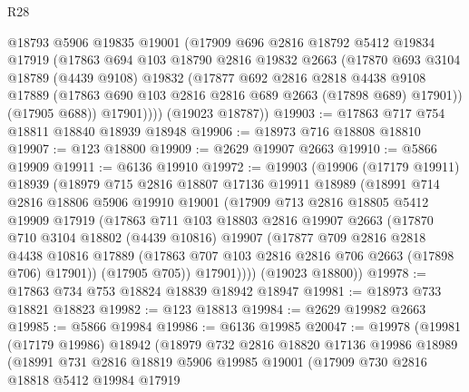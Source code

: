 \begin{lexlean}{R28}
\begin{coremodule}
          @18793
          @5906
          @19835
          @19001
          (@17909
            @696
            @2816
            @18792
            @5412
            @19834
            @17919
            (@17863
              @694
              @103
              @18790
              @2816
              @19832
              @2663
              (@17870
                @693
                @3104
                @18789
                (@4439 @9108)
                @19832
                (@17877
                  @692
                  @2816
                  @2818
                  @4438
                  @9108
                  @17889
                  (@17863 @690 @103 @2816 @2816 @689 @2663 (@17898 @689) @17901))
                (@17905 @688))
              @17901))))
      (@19023 @18787))
@19903 := @17863 @717 @754 @18811 @18840 @18939 @18948
@19906 := @18973 @716 @18808 @18810
@19907 := @123 @18800
@19909 := @2629 @19907 @2663
@19910 := @5866 @19909
@19911 := @6136 @19910
@19972 := @19903
    (@19906
      (@17179 @19911)
      @18939
      (@18979
        @715
        @2816
        @18807
        @17136
        @19911
        @18989
        (@18991
          @714
          @2816
          @18806
          @5906
          @19910
          @19001
          (@17909
            @713
            @2816
            @18805
            @5412
            @19909
            @17919
            (@17863
              @711
              @103
              @18803
              @2816
              @19907
              @2663
              (@17870
                @710
                @3104
                @18802
                (@4439 @10816)
                @19907
                (@17877
                  @709
                  @2816
                  @2818
                  @4438
                  @10816
                  @17889
                  (@17863 @707 @103 @2816 @2816 @706 @2663 (@17898 @706) @17901))
                (@17905 @705))
              @17901))))
      (@19023 @18800))
@19978 := @17863 @734 @753 @18824 @18839 @18942 @18947
@19981 := @18973 @733 @18821 @18823
@19982 := @123 @18813
@19984 := @2629 @19982 @2663
@19985 := @5866 @19984
@19986 := @6136 @19985
@20047 := @19978
    (@19981
      (@17179 @19986)
      @18942
      (@18979
        @732
        @2816
        @18820
        @17136
        @19986
        @18989
        (@18991
          @731
          @2816
          @18819
          @5906
          @19985
          @19001
          (@17909
            @730
            @2816
            @18818
            @5412
            @19984
            @17919

\end{coremodule}
\end{lexlean}
